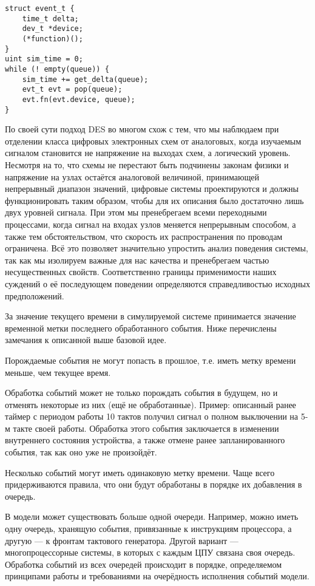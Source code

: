 
\begin{lstlisting}
struct event_t {
    time_t delta;
    dev_t *device;
    (*function)();
}
uint sim_time = 0;
while (! empty(queue)) {
    sim_time += get_delta(queue);
    evt_t evt = pop(queue);
    evt.fn(evt.device, queue);
}
\end{lstlisting}

\begin{digression}
По своей сути подход DES во многом схож с тем, что мы наблюдаем при отделении класса цифровых электронных схем от аналоговых, когда изучаемым сигналом становится не напряжение на выходах схем, а логический уровень. Несмотря на то, что схемы не перестают быть подчинены законам физики и напряжение на узлах остаётся аналоговой величиной, принимающей непрерывный диапазон значений, цифровые системы проектируются и должны функционировать таким образом, чтобы для их описания было достаточно лишь двух уровней сигнала. При этом мы пренебрегаем всеми переходными процессами, когда сигнал на входах узлов меняется непрерывным способом, а также тем обстоятельством, что скорость их распространения по проводам ограничена. Всё это позволяет значительно упростить анализ поведения системы, так как мы изолируем важные для нас качества и пренебрегаем частью несущественных свойств. Соответственно границы применимости наших суждений о её последующем поведении определяются справедливостью исходных предположений.
\end{digression}

За значение текущего времени в симулируемой системе принимается значение временной метки последнего обработанного события. Ниже перечислены замечания к описанной выше базовой идее.

\begin{itemize*}
\item Порождаемые события не могут попасть в прошлое, т.е. иметь метку времени меньше, чем текущее время.

\item Обработка событий может не только порождать события в будущем, но и отменять некоторые из них (ещё не обработанные). Пример: описанный ранее таймер с периодом работы 10 тактов получил сигнал о  полном выключении на 5-м такте своей работы. Обработка этого события заключается в изменении внутреннего состояния устройства, а также отмене ранее запланированного события, так как оно уже не произойдёт.

\item Несколько событий могут иметь одинаковую метку времени. Чаще всего придерживаются правила, что они будут обработаны в порядке их добавления в очередь.

\item В модели может существовать больше одной очереди. Например, можно иметь одну очередь, хранящую события, привязанные к инструкциям процессора, а другую --- к фронтам  тактового генератора. Другой вариант --- многопроцессорные системы, в которых с каждым ЦПУ связана своя очередь. Обработка событий из всех очередей происходит в порядке, определяемом принципами работы и требованиями на очерёдность исполнения событий модели.
\end{itemize*}

